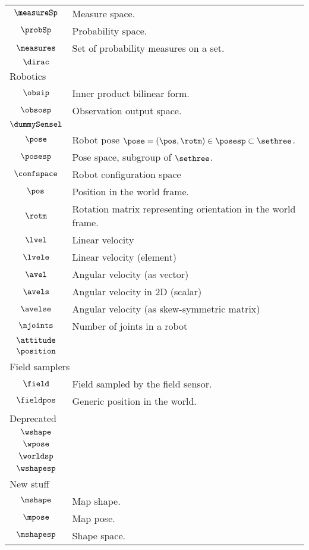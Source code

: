 \begin{longtable}{cl}
 $\measureSp$ &  Measure space.\\ 
 $\probSp$ &  Probability space.\\ 
 $\measures$ &  Set of probability measures on a set.\\ 
 $\dirac$ & \\ 
 \multicolumn{2}{l}{Robotics}\\ 
 \hline
$\obsip$ &  Inner product bilinear form.\\ 
 $\obsosp$ &  Observation output space.\\ 
 $\dummySensel$ & \\ 
 $\pose$ &  Robot pose $\pose = (\pos, \rotm) \in \posesp \subset \sethree$.\\ 
 $\posesp$ &  Pose space, subgroup of $\sethree$.\\ 
 $\confspace$ &  Robot configuration space\\ 
 $\pos$ &  Position in the world frame.\\ 
 $\rotm$ &  Rotation matrix representing orientation in the world frame.\\ 
 $\lvel$ &  Linear velocity\\ 
 $\lvele$ &  Linear velocity (element)\\ 
 $\avel$ &  Angular velocity (as vector)\\ 
 $\avels$ &  Angular velocity in 2D (scalar)\\ 
 $\avelse$ &  Angular velocity (as skew-symmetric matrix)\\ 
 $\njoints$ &  Number of joints in a robot\\ 
 $\attitude$ & \\ 
 $\position$ & \\ 
 \multicolumn{2}{l}{Field samplers}\\ 
 \hline
$\field$ &  Field sampled by the field sensor.\\ 
 $\fieldpos$ &  Generic position in the world.\\ 
 \multicolumn{2}{l}{Deprecated}\\ 
 \hline
$\wshape$ & \\ 
 $\wpose$ & \\ 
 $\worldsp$ & \\ 
 $\wshapesp$ & \\ 
 \multicolumn{2}{l}{New stuff}\\ 
 \hline
$\mshape$ &  Map shape.\\ 
 $\mpose$ &  Map pose.\\ 
 $\mshapesp$ &  Shape space.\\ 

\end{longtable}
